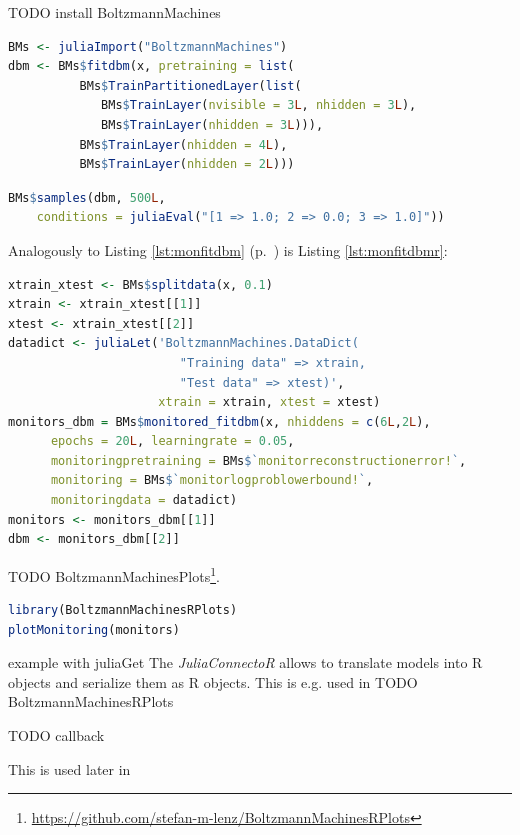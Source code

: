 \documentclass[12pt]{article}
\newcommand{\apkg}[1]{\emph{#1}}
\begin{document}
TODO install BoltzmannMachines


\begin{lstlisting}[language=R,caption={Fitting a partitioned DBM in R via the \apkg{JuliaConnectoR}},label={lst:partdbmr}, float=!h]
BMs <- juliaImport("BoltzmannMachines")
dbm <- BMs$fitdbm(x, pretraining = list(
          BMs$TrainPartitionedLayer(list(
             BMs$TrainLayer(nvisible = 3L, nhidden = 3L),
             BMs$TrainLayer(nhidden = 3L))),
          BMs$TrainLayer(nhidden = 4L),
          BMs$TrainLayer(nhidden = 2L)))
\end{lstlisting}

\begin{lstlisting}[language=R]
BMs$samples(dbm, 500L, 
    conditions = juliaEval("[1 => 1.0; 2 => 0.0; 3 => 1.0]"))
\end{lstlisting}

Analogously to Listing \ref{lst:monfitdbm} (p.~\pageref{lst:monfitdbm}) is Listing \ref{lst:monfitdbmr}:

\begin{lstlisting}[language=R,caption={Monitoring pre-training and fine-tuning}, label={lst:monfitdbmr}, float = !h]
xtrain_xtest <- BMs$splitdata(x, 0.1)
xtrain <- xtrain_xtest[[1]]
xtest <- xtrain_xtest[[2]]
datadict <- juliaLet('BoltzmannMachines.DataDict(
                        "Training data" => xtrain,
                        "Test data" => xtest)',
                     xtrain = xtrain, xtest = xtest)
monitors_dbm = BMs$monitored_fitdbm(x, nhiddens = c(6L,2L),
      epochs = 20L, learningrate = 0.05,
      monitoringpretraining = BMs$`monitorreconstructionerror!`,
      monitoring = BMs$`monitorlogproblowerbound!`,
      monitoringdata = datadict)
monitors <- monitors_dbm[[1]]
dbm <- monitors_dbm[[2]]
\end{lstlisting}

TODO BoltzmannMachinesPlots\footnote{\url{https://github.com/stefan-m-lenz/BoltzmannMachinesRPlots}}.

\begin{lstlisting}[language=R]
library(BoltzmannMachinesRPlots)
plotMonitoring(monitors)
\end{lstlisting}



example with juliaGet
The \apkg{JuliaConnectoR} allows to translate models into R objects and serialize them as R objects.
This is e.g. used in TODO BoltzmannMachinesRPlots

TODO callback

This is used later in
\end{document}
